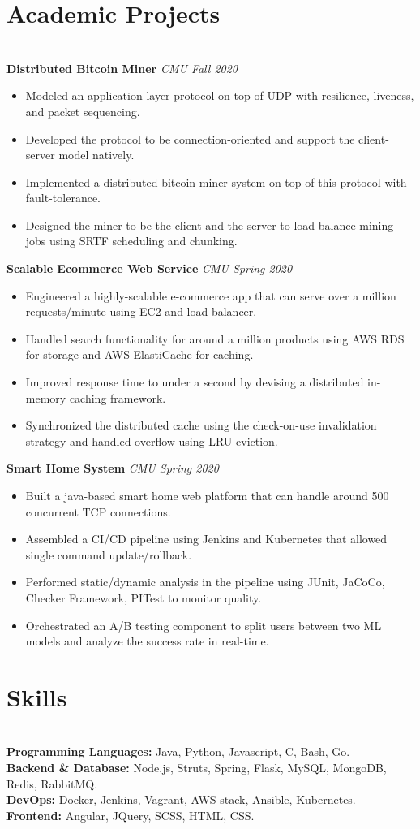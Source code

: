 \documentclass{resume}
\begin{document}
\section*{Academic Projects}
\titlerule
\noindent
\\
\textbf{Distributed Bitcoin Miner} \hfill \textit{CMU Fall 2020}
\begin{itemize}
  \item Modeled an application layer protocol on top of UDP with resilience, liveness, and packet sequencing.
  \item Developed the protocol to be connection-oriented and support the client-server model natively.
  \item Implemented a distributed bitcoin miner system on top of this protocol with fault-tolerance.
  \item Designed the miner to be the client and the server to load-balance mining jobs using SRTF scheduling and chunking.
\end{itemize}
\textbf{Scalable Ecommerce Web Service} \hfill \textit{CMU Spring 2020}
\begin{itemize}
  \item Engineered a highly-scalable e-commerce app that can serve over a million requests/minute using EC2 and load balancer.
  \item Handled search functionality for around a million products using AWS RDS for storage and AWS ElastiCache for caching.
  \item Improved response time to under a second by devising a distributed in-memory caching framework.
  \item Synchronized the distributed cache using the check-on-use invalidation strategy and handled overflow using LRU eviction.
\end{itemize}
\textbf{Smart Home System} \hfill \textit{CMU Spring 2020}
\begin{itemize}
  \item Built a java-based smart home web platform that can handle around 500 concurrent TCP connections.
  \item Assembled a CI/CD pipeline using Jenkins and Kubernetes that allowed single command update/rollback.
  \item Performed static/dynamic analysis in the pipeline using JUnit, JaCoCo, Checker Framework, PITest to monitor quality.
  \item Orchestrated an A/B testing component to split users between two ML models and analyze the success rate in real-time.
\end{itemize}
\section*{Skills}
\titlerule
\noindent
\\
\textbf{Programming Languages:} Java, Python, Javascript, C, Bash, Go. \\
\textbf{Backend \& Database:} Node.js, Struts, Spring, Flask, MySQL, MongoDB, Redis, RabbitMQ. \\
\textbf{DevOps:} Docker, Jenkins, Vagrant, AWS stack, Ansible, Kubernetes. \\
\textbf{Frontend:} Angular, JQuery, SCSS, HTML, CSS.
\end{document}
